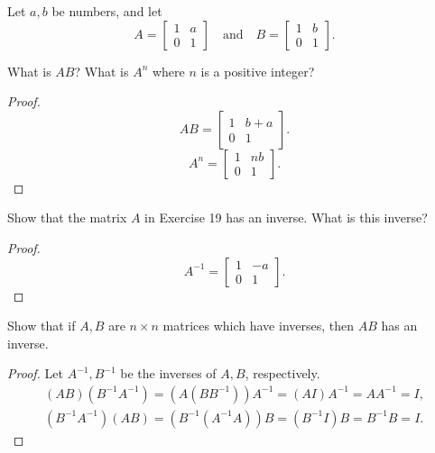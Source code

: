 \begin{exercise}
    Let $a, b$ be numbers, and let
    \[
        A = \begin{bmatrix}
            1 & a \\
            0 & 1
        \end{bmatrix}
        \quad\text{and}\quad
        B = \begin{bmatrix}
            1 & b \\
            0 & 1
        \end{bmatrix}.
    \]

    What is $AB$? What is $A^{n}$ where $n$ is a positive integer?
\end{exercise}

\begin{proof}
    \[
        AB = \begin{bmatrix}
            1 & b + a \\
            0 & 1
        \end{bmatrix}.
    \]
    \[
        A^{n} = \begin{bmatrix}
            1 & nb \\
            0 & 1
        \end{bmatrix}.
    \]
\end{proof}

\begin{exercise}
    Show that the matrix $A$ in Exercise 19 has an inverse. What is this inverse?
\end{exercise}

\begin{proof}
    \[
        A^{-1} = \begin{bmatrix}
            1 & -a \\
            0 & 1
        \end{bmatrix}.
    \]
\end{proof}

\begin{exercise}
    Show that if $A, B$ are $n\times n$ matrices which have inverses, then $AB$ has an inverse.
\end{exercise}

\begin{proof}
    Let $A^{-1}, B^{-1}$ be the inverses of $A, B$, respectively.
    \[
        \begin{split}
            (AB)(B^{-1}A^{-1}) = (A(BB^{-1}))A^{-1} = (AI)A^{-1} = AA^{-1} = I, \\
            (B^{-1}A^{-1})(AB) = (B^{-1}(A^{-1}A))B = (B^{-1}I)B = B^{-1}B = I.
        \end{split}
    \]
\end{proof}

